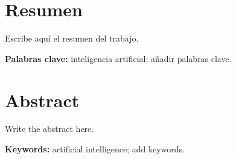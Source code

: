 \chapter*{Resumen}
Escribe aquí el resumen del trabajo.

\noindent\textbf{Palabras clave:} inteligencia artificial; añadir palabras clave.

\chapter*{Abstract}
Write the abstract here.

\noindent\textbf{Keywords:} artificial intelligence; add keywords.
